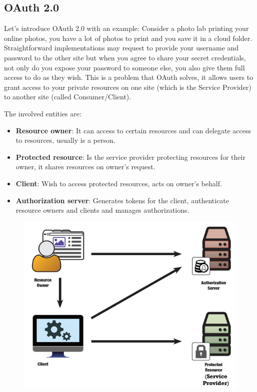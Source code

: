 \subsection{OAuth 2.0}
Let's introduce OAuth 2.0 with an example: Consider a photo lab printing your online photos, you have a lot of photos to print and you save it in a cloud folder. Straightforward implementations may request to provide your username and password to the other site but when you agree to share your secret credentials, not only do you expose your password to someone else, you also give them full access to do as they wish. This is a problem that OAuth solves, it allows users to grant access to your private resources on one site (which is the Service Provider) to another site (called Consumer/Client).

The involved entities are:
\begin{itemize}
    \item \textbf{Resource owner}: It can access to certain resources and can delegate access to resources, usually is a person.
    \item \textbf{Protected resource}: Is the service provider protecting resources for their owner, it shares resources on owner's request.
    \item \textbf{Client}: Wish to access protected resources, acts on owner's behalf.
    \item \textbf{Authorization server}: Generates tokens for the client, authenticate resource owners and clients and manages authorizations.
\end{itemize}

\begin{figure}[h!]
    \centering
    \includegraphics[scale=0.2]{images/oauth.png}
\end{figure}

